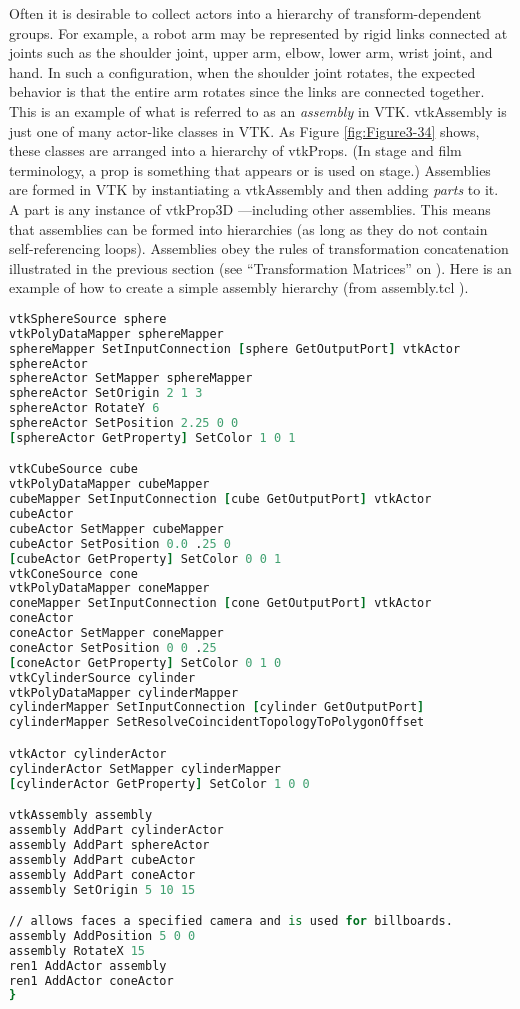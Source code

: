Often it is desirable to collect actors into a hierarchy of transform-dependent groups. For example, a robot arm may be represented by rigid links connected at joints such as the shoulder joint, upper arm, elbow, lower arm, wrist joint, and hand. In such a configuration, when the shoulder joint rotates, the expected behavior is that the entire arm rotates since the links are connected together. This is an example of what is referred to as an \emph{assembly} in VTK. vtkAssembly is just one of many actor-like classes in VTK. As Figure \ref{fig:Figure3-34} shows, these classes are arranged into a hierarchy of vtkProps. (In stage and film terminology, a prop is something that appears or is used on stage.) Assemblies are formed in VTK by instantiating a vtkAssembly and then adding \emph{parts} to it. A part is any instance of vtkProp3D ---including other assemblies. This means that assemblies can be formed into hierarchies (as long as they do not contain self-referencing loops). Assemblies obey the rules of transformation concatenation illustrated in the previous section (see ``Transformation Matrices'' on \pageref{sec:transform_matrices} ). Here is an example of how to create a simple assembly hierarchy (from assembly.tcl ).

\begin{lstlisting}[language=TCL, caption={Part of assembly.tcl}]
vtkSphereSource sphere
vtkPolyDataMapper sphereMapper
sphereMapper SetInputConnection [sphere GetOutputPort] vtkActor
sphereActor
sphereActor SetMapper sphereMapper
sphereActor SetOrigin 2 1 3
sphereActor RotateY 6
sphereActor SetPosition 2.25 0 0
[sphereActor GetProperty] SetColor 1 0 1

vtkCubeSource cube
vtkPolyDataMapper cubeMapper
cubeMapper SetInputConnection [cube GetOutputPort] vtkActor
cubeActor
cubeActor SetMapper cubeMapper
cubeActor SetPosition 0.0 .25 0
[cubeActor GetProperty] SetColor 0 0 1
vtkConeSource cone
vtkPolyDataMapper coneMapper
coneMapper SetInputConnection [cone GetOutputPort] vtkActor
coneActor
coneActor SetMapper coneMapper
coneActor SetPosition 0 0 .25
[coneActor GetProperty] SetColor 0 1 0
vtkCylinderSource cylinder
vtkPolyDataMapper cylinderMapper
cylinderMapper SetInputConnection [cylinder GetOutputPort]
cylinderMapper SetResolveCoincidentTopologyToPolygonOffset

vtkActor cylinderActor
cylinderActor SetMapper cylinderMapper
[cylinderActor GetProperty] SetColor 1 0 0

vtkAssembly assembly
assembly AddPart cylinderActor
assembly AddPart sphereActor
assembly AddPart cubeActor
assembly AddPart coneActor
assembly SetOrigin 5 10 15

// allows faces a specified camera and is used for billboards.
assembly AddPosition 5 0 0
assembly RotateX 15
ren1 AddActor assembly
ren1 AddActor coneActor
}\end{lstlisting}

